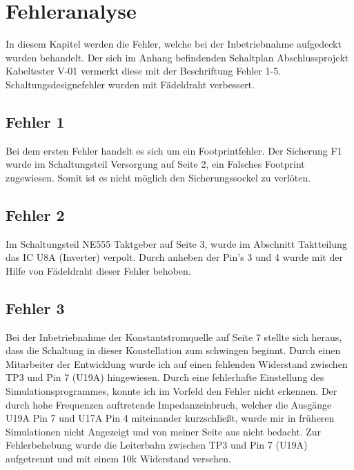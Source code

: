 \section{Fehleranalyse}

\begin{center}
In diesem Kapitel werden die Fehler, welche bei der Inbetriebnahme aufgedeckt wurden behandelt. Der sich im Anhang befindenden Schaltplan \glqq Abschlussprojekt Kabeltester  V-01\grqq{} vermerkt diese mit der Beschriftung \glqq Fehler 1-5\grqq{}. Schaltungsdesignefehler wurden mit Fädeldraht verbessert.  
\end{center}



\subsection{Fehler 1}

Bei dem ersten Fehler handelt es sich um ein Footprintfehler. Der Sicherung F1 wurde im Schaltungsteil \glqq Versorgung \grqq{} auf Seite 2, ein Falsches Footprint zugewiesen. Somit ist es nicht möglich den Sicherungssockel zu verlöten. 


\subsection{Fehler 2}

Im Schaltungsteil \glqq NE555 Taktgeber \grqq{} auf Seite 3, wurde im Abschnitt \glqq Taktteilung \grqq{} das IC U8A (Inverter) verpolt. Durch anheben der Pin's 3 und 4 wurde mit der Hilfe von Fädeldraht dieser Fehler behoben.



\subsection{Fehler 3}

Bei der Inbetriebnahme der Konstantstromquelle auf Seite 7 stellte sich heraus, dass die Schaltung in dieser Konstellation zum schwingen beginnt. Durch einen Mitarbeiter der Entwicklung wurde ich auf einen fehlenden Widerstand zwischen TP3 und Pin 7 (U19A) hingewiesen. Durch eine fehlerhafte Einstellung des Simulationsprogrammes, konnte ich im Vorfeld den Fehler nicht erkennen. Der durch hohe Frequenzen auftretende Impedanzeinbruch, welcher die Ausgänge U19A Pin 7 und U17A Pin 4 miteinander kurzschließt, wurde mir in früheren Simulationen nicht Angezeigt und von meiner Seite aus nicht bedacht. Zur Fehlerbehebung wurde die Leiterbahn zwischen TP3 und Pin 7 (U19A) aufgetrennt und mit einem 10k Widerstand versehen. 



